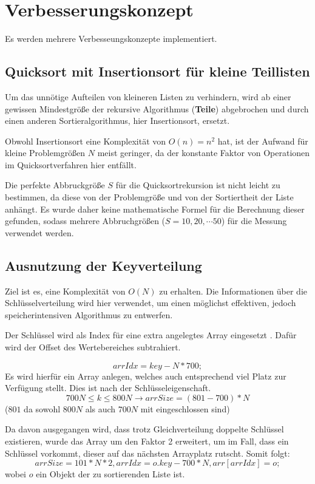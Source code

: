 \documentclass[
   draft=false
  ,paper=a4
  ,twoside=false
  ,fontsize=11pt
  ,headsepline
  ,DIV=11
  ,parskip=full+
  ,titlepage
]{scrartcl} %
\begin{document}
\section{Verbesserungskonzept}
Es werden mehrere Verbesseungskonzepte implementiert.
\subsection{Quicksort mit Insertionsort für kleine Teillisten}
Um das unnötige Aufteilen von kleineren Listen zu verhindern, 
wird ab einer gewissen Mindestgröße der rekursive
Algorithmus (\textbf{Teile}) abgebrochen und durch einen anderen
Sortieralgorithmus, hier Insertionsort, ersetzt. \citep{AD}

Obwohl Insertionsort eine Komplexität von $O(n)=n^2$ hat, ist der Aufwand für 
kleine Problemgrößen $N$ meist geringer, 
da der konstante Faktor von Operationen im Quicksortverfahren hier entfällt. 

Die perfekte Abbruckgröße $S$ für die Quicksortrekursion ist nicht leicht zu
bestimmen, da diese von der Problemgröße und von der Sortiertheit der Liste 
anhängt. Es wurde daher keine mathematische Formel für die Berechnung dieser
gefunden, sodass mehrere Abbruchgrößen ($S = 10, 20, \cdots 50$) 
für die Messung verwendet werden. 

\subsection{Ausnutzung der Keyverteilung}
Ziel ist es, eine Komplexität von $O(N)$ zu erhalten.
Die Informationen über die Schlüsselverteilung wird hier verwendet, um einen
möglichst effektiven, jedoch speicherintensiven Algorithmus zu entwerfen.

Der Schlüssel wird als Index für eine extra angelegtes Array eingesetzt 
\citep{AD}. Dafür wird der Offset des Wertebereiches subtrahiert. 

\[
arrIdx = key - N*700;
\]
Es wird hierfür ein Array anlegen, welches auch entsprechend viel Platz 
zur Verfügung stellt. Dies ist nach der Schlüsseleigenschaft.
\[
700N \leq k \leq 800N \to arrSize = (801 - 700)*N
\]
($801$ da sowohl $800N$ als auch $700N$ mit eingeschlossen sind)

Da davon ausgegangen wird, dass trotz Gleichverteilung
doppelte Schlüssel existieren, wurde das Array um den Faktor 2 erweitert, um
im Fall, dass ein Schlüssel vorkommt, dieser auf das nächsten Arrayplatz
rutscht. Somit folgt:
\[
arrSize = 101*N*2, arrIdx = o.key - 700*N , arr[arrIdx] = o;
\] 
wobei $o$ ein Objekt der zu sortierenden Liste ist. 
\end{document}
